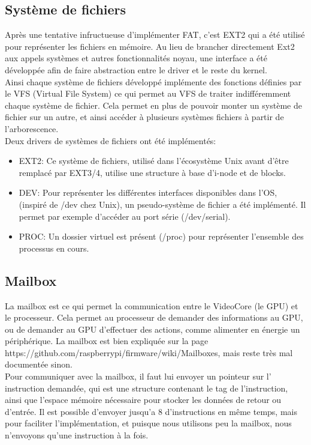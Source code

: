 \documentclass[a4paper]{article}
\begin{document}
\subsection{Système de fichiers}
Après une tentative infructueuse d'implémenter FAT, c'est EXT2 qui a été utilisé
pour représenter les fichiers en mémoire.
Au lieu de brancher directement Ext2 aux appels systèmes et autres fonctionnalités
noyau, une interface a été développée afin de faire abstraction entre le driver
et le reste du kernel. \\
Ainsi chaque système de fichiers développé implémente des fonctions définies
par le VFS (Virtual File System) ce qui permet au VFS de traiter indifféremment
chaque système de fichier. Cela permet en plus de pouvoir monter un système de
fichier sur un autre, et ainsi accéder à plusieurs systèmes fichiers à partir de
l'arborescence. \\
Deux drivers de systèmes de fichiers ont été implémentés:
\begin{itemize}
	\item EXT2: Ce système de fichiers, utilisé dans l'écosystème Unix avant
	d'être remplacé par EXT3/4, utilise une structure à base d'i-node et de blocks.
	\item DEV: Pour représenter les différentes interfaces disponibles dans l'OS,
	(inspiré de /dev chez Unix), un pseudo-système de fichier a été implémenté.
	Il permet par exemple d'accéder au port série (/dev/serial).
	\item PROC: Un dossier virtuel est présent (/proc) pour représenter l'ensemble des processus en cours.
\end{itemize}

\subsection{Mailbox}

La mailbox est ce qui permet la communication entre le VideoCore (le GPU) et le
processeur. Cela permet au processeur de demander des informations au GPU, ou
de demander au GPU d'effectuer des actions, comme alimenter en énergie un
périphérique. La mailbox est bien expliquée sur la page
https://github.com/raspberrypi/firmware/wiki/Mailboxes, mais reste très mal
documentée sinon.\\

Pour communiquer avec la mailbox, il faut lui envoyer un pointeur sur l'
instruction demandée, qui est une structure contenant le tag de
l'instruction, ainsi que l'espace mémoire nécessaire pour stocker les données de
retour ou d'entrée. Il est possible d'envoyer jusqu'a 8 d'instructions en même
temps, mais pour faciliter l'implémentation, et puisque nous utilisons peu la
mailbox, nous n'envoyons qu'une instruction à la fois.
\end{document}
